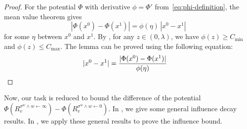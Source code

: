 \documentclass[11pt]{amsart}
\newcommand{\abs}[1]{\ensuremath{\left\vert#1\right\vert}}
\newtheorem{lemma}[theorem]{Lemma}
\theoremstyle{definition}
\theoremstyle{remark}
\begin{document}

\begin{proof}
For the potential $\Phi$ with derivative $\phi = \Phi'$ from~\eqref{eq:phi-definition}, the mean value theorem gives
\[
|\Phi(x^0) - \Phi(x^1)| = \phi(\eta)\,|x^0 - x^1|
\]
for some $\eta$ between $x^0$ and $x^1$. By , for any $z \in (0,\lambda)$, we have $\phi(z) \geq C_{\min}$ and $\phi(z) \leq C_{\max}$. The lemma can be proved using the following equation:
\begin{align*}
|x^0 - x^1| = \frac{|\Phi(x^0) - \Phi(x^1)|}{\phi(\eta)} &\qedhere
\end{align*}
\end{proof}

Now, our task is reduced to bound the difference of the potential $\Phi(R_v^{\sigma^w \land w \gets \infty}) - \Phi(R_v^{\sigma^w \land w \gets 0})$. In , we give some general influence decay results. In , we apply these general results to prove the influence bound.
\end{document}
